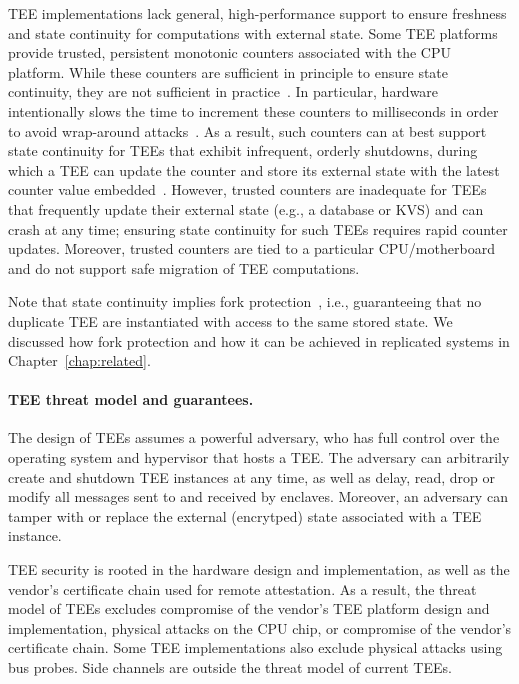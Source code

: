 \ac{TEE} implementations lack general, high-performance support to ensure
freshness and state continuity for computations with external state.
Some \ac{TEE} platforms provide trusted, persistent monotonic counters
associated with the CPU platform. While these counters are sufficient
in principle to ensure state continuity, they are not sufficient in
practice~\cite{ariadne}.  In particular, hardware intentionally slows
the time to increment these counters to milliseconds in order to avoid
wrap-around attacks~\cite{ariadne,rote}.  As a result, such counters
can at best support state continuity for \acp{TEE} that exhibit infrequent,
orderly shutdowns, during which a \ac{TEE} can update the counter and store
its external state with the latest counter value
embedded~\cite{ariadne}.  However, trusted counters are inadequate for
\acp{TEE} that frequently update their external state (e.g., a database or
\ac{KVS}) and can crash at any time; ensuring state continuity
for such \acp{TEE} requires rapid counter updates.  Moreover, trusted
counters are tied to a particular CPU/motherboard and do not support
safe migration of \ac{TEE} computations.

Note that state continuity implies fork
protection~\cite{fork_lcm}, i.e., guaranteeing that no duplicate
\ac{TEE} are instantiated with access to the same stored state.
We discussed how fork protection and how it can be achieved in
replicated systems in Chapter~\ref{chap:related}.

\paragraph{\ac{TEE} threat model and guarantees.}

The design of \acp{TEE} assumes a powerful adversary, who has full
control over the operating system and hypervisor that hosts a \ac{TEE}.
The adversary can arbitrarily create and shutdown \ac{TEE} instances at
any time, as well as delay, read, drop or modify all messages sent
to and received by enclaves.  Moreover, an adversary can tamper with
or replace the external (encrytped) state associated with a \ac{TEE}
instance.

\ac{TEE} security is rooted in the hardware design and implementation, as
well as the vendor's certificate chain used for remote attestation. As
a result, the threat model of \acp{TEE} excludes compromise of the vendor's
\ac{TEE} platform design and implementation, physical attacks on the CPU
chip, or compromise of the vendor's certificate chain.  Some \ac{TEE}
implementations also exclude physical attacks using bus probes.  Side
channels are outside the threat model of current \acp{TEE}.

